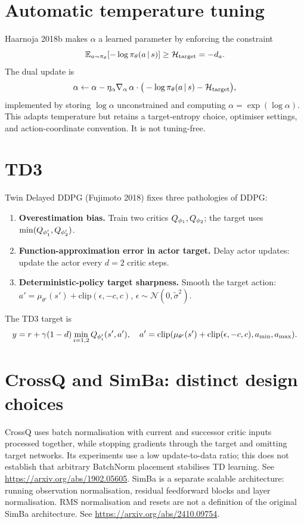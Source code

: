 \documentclass[11pt,oneside]{scrbook}
\begin{document}
\section{Automatic temperature tuning}

Haarnoja 2018b makes $\alpha$ a learned parameter by enforcing the constraint
\[
  \mathbb{E}_{a \sim \pi_\theta}[-\log \pi_\theta(a\,\vert\, s)] \ge \mathcal{H}_\text{target} = -d_a.
\]
The dual update is
\[
  \alpha \leftarrow \alpha - \eta_\alpha \nabla_\alpha\, \alpha \cdot \big(-\log \pi_\theta(a\,\vert\, s) - \mathcal{H}_\text{target}\big),
\]
implemented by storing $\log\alpha$ unconstrained and computing $\alpha = \exp(\log\alpha)$. This adapts temperature but retains a target-entropy choice, optimiser
settings, and action-coordinate convention. It is not tuning-free.

\section{TD3}

Twin Delayed DDPG (Fujimoto 2018) fixes three pathologies of DDPG:
\begin{enumerate}[leftmargin=*]
  \item \textbf{Overestimation bias.} Train two critics $Q_{\phi_1}, Q_{\phi_2}$; the target uses $\min(Q_{\phi_1'}, Q_{\phi_2'})$.
  \item \textbf{Function-approximation error in actor target.} Delay actor updates: update the actor every $d=2$ critic steps.
  \item \textbf{Deterministic-policy target sharpness.} Smooth the target action: $a' = \mu_{\theta'}(s') + \mathrm{clip}(\epsilon, -c, c)$, $\epsilon \sim \mathcal{N}(0, \tilde\sigma^2)$.
\end{enumerate}

The TD3 target is
\[
  y = r + \gamma(1-d) \min_{i=1,2} Q_{\phi_i'}(s', a'), \quad
  a'=\mathrm{clip}(\mu_{\theta'}(s')+\mathrm{clip}(\epsilon,-c,c),a_{\min},a_{\max}).
\]

\section{CrossQ and SimBa: distinct design choices}
CrossQ uses batch normalisation with current and successor critic inputs
processed together, while stopping gradients through the target and omitting
target networks. Its experiments use a low update-to-data ratio; this does
not establish that arbitrary BatchNorm placement stabilises TD learning.
See \url{https://arxiv.org/abs/1902.05605}.
SimBa is a separate scalable architecture: running observation normalisation,
residual feedforward blocks and layer normalisation. RMS normalisation and
resets are not a definition of the original SimBa architecture.
See \url{https://arxiv.org/abs/2410.09754}.
\end{document}
